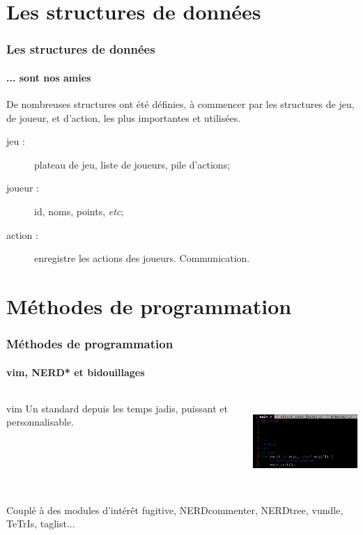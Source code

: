 \documentclass{beamer}
\begin{document}
    \section{Les structures de données}
    \begin{frame}
    \frametitle{Les structures de données}
    \framesubtitle{... sont nos amies}
        De nombreuses structures ont été définies, à commencer 
            par les structures de jeu, de joueur, et d'action, 
            les plus importantes et utilisées.\\
        \begin{description}
            \item[jeu :] plateau de jeu, liste de joueurs, pile d'actions;\\
            \item[joueur :] id, noms, points, \textit{etc};\\
            \item[action :] enregistre les actions des joueurs. Communication.\\
        \end{description}
    \end{frame}






    \section{Méthodes de programmation}
    \begin{frame}
    \frametitle{Méthodes de programmation}
    \framesubtitle{vim, NERD* et bidouillages}
        \begin{columns}[c] %
            \begin{column}{6cm} %
                \begin{block}{vim}
                    Un standard depuis les temps jadis, puissant et personnalisable.
                \end{block}
            \end{column}
            \begin{column}{5cm} %
                \includegraphics[width=5cm, height=3cm]{ressources/presentation/vim.png}
            \end{column}
        \end{columns}
        \vspace{1cm} %
        \begin{exampleblock}{Couplé à des modules d'intérêt}
            fugitive, NERDcommenter, NERDtree, vundle, TeTrIs, taglist... 
        \end{exampleblock}
    \end{frame}
\end{document}
